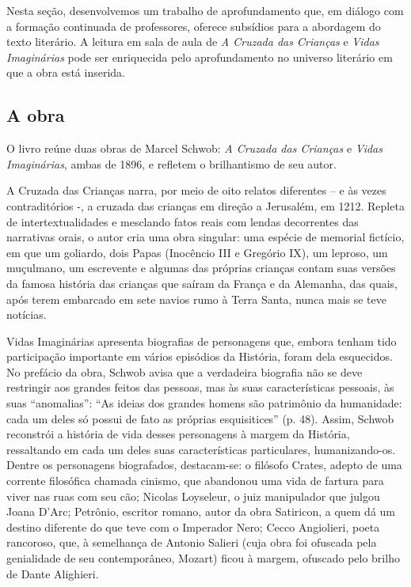 \documentclass[12pt]{extarticle}
\begin{document}
Nesta seção, desenvolvemos um trabalho de aprofundamento que, em diálogo
com a formação continuada de professores, oferece subsídios para a
abordagem do texto literário. A leitura em sala de aula de \emph{A
Cruzada das Crianças} e \emph{Vidas Imaginárias} pode ser enriquecida
pelo aprofundamento no universo literário em que a obra está inserida.

\subsection{A obra}

O livro reúne duas obras de Marcel Schwob: \emph{A Cruzada das Crianças}
e \emph{Vidas Imaginárias}, ambas de 1896, e refletem o brilhantismo de
seu autor.

A Cruzada das Crianças narra, por meio de oito relatos diferentes -- e
às vezes contraditórios -, a cruzada das crianças em direção a
Jerusalém, em 1212. Repleta de intertextualidades e mesclando fatos
reais com lendas decorrentes das narrativas orais, o autor cria uma obra
singular: uma espécie de memorial fictício, em que um goliardo, dois
Papas (Inocêncio III e Gregório IX), um leproso, um muçulmano, um
escrevente e algumas das próprias crianças contam suas versões da famosa
história das crianças que saíram da França e da Alemanha, das quais,
após terem embarcado em sete navios rumo à Terra Santa, nunca mais se
teve notícias.

Vidas Imaginárias apresenta biografias de personagens que, embora tenham
tido participação importante em vários episódios da História, foram dela
esquecidos. No prefácio da obra, Schwob avisa que a verdadeira biografia
não se deve restringir aos grandes feitos das pessoas, mas às suas
características pessoais, às suas ``anomalias'': ``As ideias dos grandes
homens são patrimônio da humanidade: cada um deles só possui de fato as
próprias esquisitices'' (p. 48). Assim, Schwob reconstrói a história de
vida desses personagens à margem da História, ressaltando em cada um
deles suas características particulares, humanizando-os. Dentre os
personagens biografados, destacam-se: o filósofo Crates, adepto de uma
corrente filosófica chamada cinismo, que abandonou uma vida de fartura
para viver nas ruas com seu cão; Nicolas Loyseleur, o juiz manipulador
que julgou Joana D'Arc; Petrônio, escritor romano, autor da obra
Satiricon, a quem dá um destino diferente do que teve com o Imperador
Nero; Cecco Angiolieri, poeta rancoroso, que, à semelhança de Antonio
Salieri (cuja obra foi ofuscada pela genialidade de seu contemporâneo,
Mozart) ficou à margem, ofuscado pelo brilho de Dante Alighieri.
\end{document}
